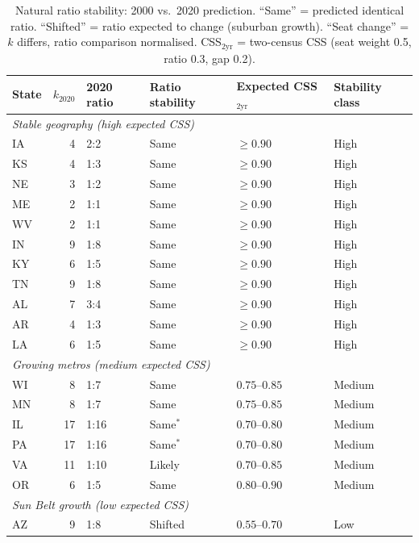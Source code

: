\begin{table}[h]
\centering
\caption{Natural ratio stability: 2000 vs.\ 2020 prediction.
  ``Same'' = predicted identical ratio.
  ``Shifted'' = ratio expected to change (suburban growth).
  ``Seat change'' = $k$ differs, ratio comparison normalised.
  CSS$_{2\text{yr}}$ = two-census CSS (seat weight 0.5, ratio 0.3, gap 0.2).}
\label{tab:ratio-stability}
\small
\begin{tabular}{l r l l l l}
\toprule
State & $k_{2020}$ & 2020 ratio & Ratio stability & Expected CSS$_{2\text{yr}}$ & Stability class \\
\midrule
\multicolumn{6}{l}{\textit{Stable geography (high expected CSS)}} \\
IA  &  4 & 2:2  & Same     & $\geq 0.90$ & High \\
KS  &  4 & 1:3  & Same     & $\geq 0.90$ & High \\
NE  &  3 & 1:2  & Same     & $\geq 0.90$ & High \\
ME  &  2 & 1:1  & Same     & $\geq 0.90$ & High \\
WV  &  2 & 1:1  & Same     & $\geq 0.90$ & High \\
IN  &  9 & 1:8  & Same     & $\geq 0.90$ & High \\
KY  &  6 & 1:5  & Same     & $\geq 0.90$ & High \\
TN  &  9 & 1:8  & Same     & $\geq 0.90$ & High \\
AL  &  7 & 3:4  & Same     & $\geq 0.90$ & High \\
AR  &  4 & 1:3  & Same     & $\geq 0.90$ & High \\
LA  &  6 & 1:5  & Same     & $\geq 0.90$ & High \\
\midrule
\multicolumn{6}{l}{\textit{Growing metros (medium expected CSS)}} \\
WI  &  8 & 1:7  & Same     & $0.75$--$0.85$ & Medium \\
MN  &  8 & 1:7  & Same     & $0.75$--$0.85$ & Medium \\
IL  & 17 & 1:16 & Same$^*$ & $0.70$--$0.80$ & Medium \\
PA  & 17 & 1:16 & Same$^*$ & $0.70$--$0.80$ & Medium \\
VA  & 11 & 1:10 & Likely   & $0.70$--$0.85$ & Medium \\
OR  &  6 & 1:5  & Same     & $0.80$--$0.90$ & Medium \\
\midrule
\multicolumn{6}{l}{\textit{Sun Belt growth (low expected CSS)}} \\
AZ  &  9 & 1:8  & Shifted  & $0.55$--$0.70$ & Low \\

\end{tabular}
\end{table}

